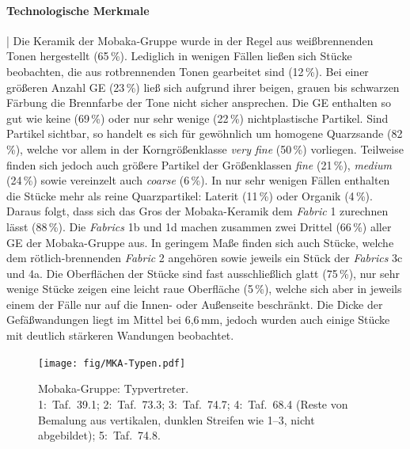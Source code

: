 \paragraph{Technologische Merkmale}\hspace{-.5em}|\hspace{.5em}%
Die Keramik der Mobaka-Gruppe wurde in der Regel aus weißbrennenden Tonen hergestellt (65\,\%). Lediglich in wenigen Fällen ließen sich Stücke beobachten, die aus rotbrennenden Tonen gearbeitet sind (12\,\%). Bei einer größeren Anzahl GE (23\,\%) ließ sich aufgrund ihrer beigen, grauen bis schwarzen Färbung die Brennfarbe der Tone nicht sicher ansprechen. Die GE enthalten so gut wie keine (69\,\%) oder nur sehr wenige (22\,\%) nichtplastische Partikel. Sind Partikel sichtbar, so handelt es sich für gewöhnlich um homogene Quarzsande (82\,\%), welche vor allem in der Korngrößenklasse \textit{very fine} (50\,\%) vorliegen. Teilweise finden sich jedoch auch größere Partikel der Größenklassen \textit{fine} (21\,\%), \textit{medium} (24\,\%) sowie vereinzelt auch \textit{coarse} (6\,\%). In nur sehr wenigen Fällen enthalten die Stücke mehr als reine Quarzpartikel: Laterit (11\,\%) oder Organik (4\,\%). Daraus folgt, dass sich das Gros der Mobaka-Keramik dem \textit{Fabric} 1 zurechnen lässt (88\,\%). Die \textit{Fabrics} 1b und 1d machen zusammen zwei Drittel (66\,\%) aller GE der Mobaka-Gruppe aus. In geringem Maße finden sich auch Stücke, welche dem rötlich-brennenden \textit{Fabric} 2 angehören sowie jeweils ein Stück der \textit{Fabrics} 3c und 4a. Die Oberflächen der Stücke sind fast ausschließlich glatt (75\,\%), nur sehr wenige Stücke zeigen eine leicht raue Oberfläche (5\,\%), welche sich aber in jeweils einem der Fälle nur auf die Innen- oder Außenseite beschränkt. Die Dicke der Gefäßwandungen liegt im Mittel bei 6,6\,mm, jedoch wurden auch einige Stücke mit deutlich stärkeren Wandungen beobachtet.

\begin{figure}[p]
	\centering
	\texttt{[image: fig/MKA-Typen.pdf]}
	\caption{Mobaka-Gruppe: Typvertreter.\\ 1:~Taf.~39.1; 2:~Taf.~73.3; 3:~Taf.~74.7; 4:~Taf.~68.4 (Reste von Bemalung aus vertikalen, dunklen Streifen wie 1--3, nicht abgebildet); 5:~Taf.~74.8.}
	\label{fig:MKA-Typen}
\end{figure}

